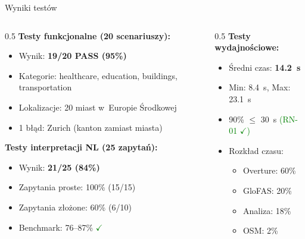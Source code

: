 \documentclass[aspectratio=169]{beamer}
\begin{document}
\begin{frame}{Wyniki testów}
\begin{columns}[T]
\begin{column}{0.5\textwidth}
\textbf{Testy funkcjonalne (20 scenariuszy):}
\begin{itemize}
    \item Wynik: \textbf{19/20 PASS (95\%)}
    \item Kategorie: healthcare, education, buildings, transportation
    \item Lokalizacje: 20 miast w~Europie Środkowej
    \item 1 błąd: Zurich (kanton zamiast miasta)
\end{itemize}

\vspace{0.3cm}

\textbf{Testy interpretacji NL (25 zapytań):}
\begin{itemize}
    \item Wynik: \textbf{21/25 (84\%)}
    \item Zapytania proste: 100\% (15/15)
    \item Zapytania złożone: 60\% (6/10)
    \item Benchmark: 76--87\% \textcolor{green}{$\checkmark$}
\end{itemize}
\end{column}

\begin{column}{0.5\textwidth}
\textbf{Testy wydajnościowe:}
\begin{itemize}
    \item Średni czas: \textbf{14.2~s}
    \item Min: 8.4~s, Max: 23.1~s
    \item 90\% $\leq$ 30~s \textcolor{green}{(RN-01 $\checkmark$)}
    \item Rozkład czasu:
    \begin{itemize}
        \item Overture: 60\%
        \item GloFAS: 20\%
        \item Analiza: 18\%
        \item OSM: 2\%
    \end{itemize}
\end{itemize}


\end{column}
\end{columns}
\end{frame}
\end{document}
